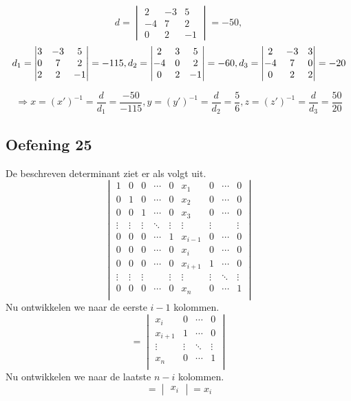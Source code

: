 \documentclass[lineaire_algebra_oplossingen.tex]{subfiles}
\begin{document}
\[  d = \begin{vmatrix}
            2 & -3 & 5\\
            -4 & 7 & 2\\
            0 & 2 & -1
    \end{vmatrix} = -50,\]
\[  d_1 = \begin{vmatrix}
        3 & -3 & 5\\
        0 & 7 & 2\\
        2 & 2 & -1
    \end{vmatrix} = -115,\\
    d_2 = \begin{vmatrix}
        2 & 3 & 5\\
        -4 & 0 & 2\\
        0 & 2 & -1
    \end{vmatrix} = -60,\\
    d_3 = \begin{vmatrix}
        2 & -3 & 3\\
        -4 & 7 & 0\\
        0 & 2 & 2
    \end{vmatrix} = -20
\]

\[\Rightarrow x = (x')^{-1}= \frac{d}{d_1} = \frac{-50}{-115},
    y = (y')^{-1}= \frac{d}{d_2} = \frac{5}{6},
    z = (z')^{-1}= \frac{d}{d_3} = \frac{50}{20}
\]

\subsection{Oefening 25}
De beschreven determinant ziet er als volgt uit.
\[
\begin{vmatrix}
1 & 0 & 0 & \cdots & 0 & x_1 & 0 & \cdots & 0 \\
0 & 1 & 0 & \cdots & 0 & x_2 & 0 & \cdots & 0 \\
0 & 0 & 1 & \cdots & 0 & x_3 & 0 & \cdots & 0 \\
\vdots & \vdots & \vdots & \ddots  & \vdots & \vdots & \vdots &  & \vdots\\
0 & 0 & 0 & \cdots & 1 & x_{i-1} & 0 &\cdots & 0 \\
0 & 0 & 0 & \cdots & 0 & x_i & 0 & \cdots & 0 \\
0 & 0 & 0 & \cdots & 0 & x_{i+1} & 1 & \cdots & 0 \\
\vdots & \vdots & \vdots &  & \vdots & \vdots & \vdots & \ddots & \vdots\\
0 & 0 & 0 & \cdots & 0 & x_n & 0 & \cdots & 1\\
\end{vmatrix}
\]
Nu ontwikkelen we naar de eerste $i-1$ kolommen.
\[
= 
\begin{vmatrix}
x_i & 0 & \cdots & 0 \\
x_{i+1} & 1 & \cdots & 0 \\
\vdots & \vdots & \ddots & \vdots\\
 x_n & 0 & \cdots & 1\\
\end{vmatrix}
\]
Nu ontwikkelen we naar de laatste $n -i$ kolommen.
\[
= 
\begin{vmatrix}
x_i
\end{vmatrix}
= x_i
\]
\end{document}
